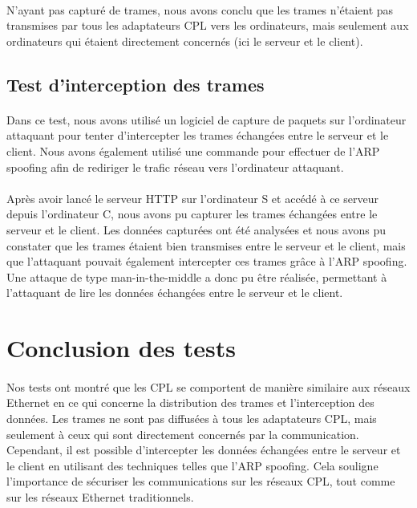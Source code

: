 \documentclass[a4paper,twocolumn]{report}
\begin{document}
\paragraph{}N'ayant pas capturé de trames, nous avons conclu que les trames n'étaient
pas transmises par tous les adaptateurs CPL vers les ordinateurs,
mais seulement aux ordinateurs qui étaient directement concernés (ici le serveur et le client).

\subsection{Test d'interception des trames}
\paragraph{}Dans ce test, nous avons utilisé un logiciel de capture de paquets sur 
l'ordinateur attaquant pour tenter d'intercepter les trames échangées entre le serveur et le client.
Nous avons également utilisé une commande pour effectuer de l'ARP spoofing afin 
de rediriger le trafic réseau vers l'ordinateur attaquant.
\paragraph{}Après avoir lancé le serveur HTTP sur l'ordinateur S et accédé à ce serveur
depuis l'ordinateur C, nous avons pu capturer les trames échangées entre le serveur et le client.
Les données capturées ont été analysées et nous avons pu constater que les trames étaient bien transmises
entre le serveur et le client, mais que l'attaquant pouvait également intercepter
ces trames grâce à l'ARP spoofing. Une attaque de type man-in-the-middle a donc pu être réalisée,
permettant à l'attaquant de lire les données échangées entre le serveur et le client.

\section{Conclusion des tests}
\paragraph{}Nos tests ont montré que les CPL se comportent de manière similaire
aux réseaux Ethernet en ce qui concerne la distribution des trames et l'interception des données.
Les trames ne sont pas diffusées à tous les adaptateurs CPL, mais seulement 
à ceux qui sont directement concernés par la communication. Cependant,
il est possible d'intercepter les données échangées entre le serveur et le client
en utilisant des techniques telles que l'ARP spoofing. Cela souligne l'importance de
sécuriser les communications sur les réseaux CPL, tout comme sur les réseaux Ethernet traditionnels.
\end{document}
